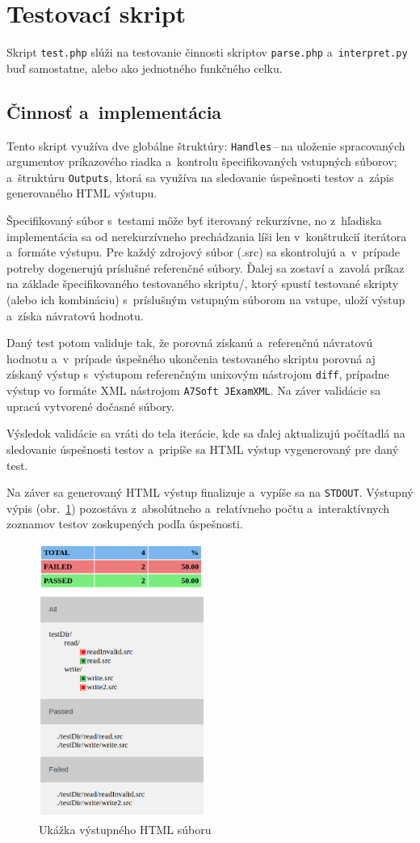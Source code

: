\documentclass[a4paper, 10pt, twocolumn]{article}
\begin{document}
\section{Testovací skript}
    Skript \texttt{test.php} slúži na testovanie činnosti skriptov \texttt{parse.php} a~\texttt{interpret.py} buď samostatne, alebo ako jednotného funkčného celku.
    
    \subsection{Činnosť a~implementácia}
        Tento skript využíva dve globálne štruktúry: \mbox{\texttt{Handles}\,--\,na} uloženie spracovaných argumentov príkazového riadka a~kontrolu špecifikovaných vstupných súborov; a~štruktúru \texttt{Outputs}, ktorá sa využíva na sledovanie úspešnosti testov a~zápis generovaného HTML výstupu.
        
        Špecifikovaný súbor s~testami môže byť iterovaný rekurzívne, no z~hľadiska implementácia sa od nerekurzívneho prechádzania líši len v~konštrukcií iterátora a~formáte výstupu. Pre každý zdrojový súbor (.src) sa skontrolujú a~v~prípade potreby dogenerujú príslušné referenčné súbory. Ďalej sa zostaví a~zavolá príkaz na základe špecifikovaného testovaného skriptu/, ktorý spustí testované skripty (alebo ich kombináciu) s~príslušným vstupným súborom na vstupe, uloží výstup a~získa návratovú hodnotu.
        
        Daný test potom validuje tak, že porovná získanú a~referenčnú návratovú hodnotu a~v~prípade úspešného ukončenia testovaného skriptu porovná aj získaný výstup s~výstupom referenčným unixovým nástrojom \texttt{diff}, prípadne výstup vo formáte XML nástrojom \texttt{A7Soft JExamXML}. Na záver validácie sa upracú vytvorené dočasné súbory.
    
        Výsledok validácie sa vráti do tela iterácie, kde sa ďalej aktualizujú počítadlá na sledovanie úspešnosti testov a~pripíše sa HTML výstup vygenerovaný pre daný test.
        
        Na záver sa generovaný HTML výstup finalizuje a~vypíše sa na \texttt{STDOUT}. Výstupný výpis (obr.~\ref{fig:output}) pozostáva z~absolútneho a~relatívneho počtu a~interaktívnych zoznamov testov zoskupených podľa úspešnosti.
        
    \begin{figure}
        \centering
        \includegraphics[width=0.48\textwidth]{testExample.png}
        \caption{Ukážka výstupného HTML súboru}
        \label{fig:output}
    \end{figure}
\end{document}
